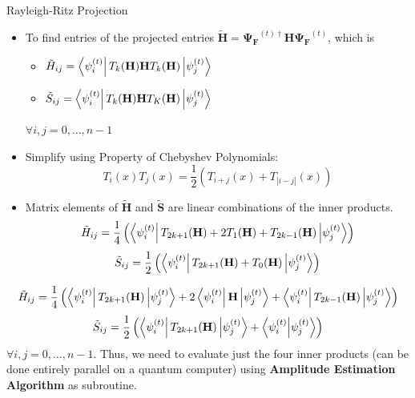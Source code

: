 \documentclass[serif, aspectratio=169]{beamer}
\begin{document}
\begin{frame}{Rayleigh-Ritz Projection}
    \begin{itemize}
        \item To find entries of the projected entries $\tilde{\mathbf{H}}=\boldsymbol{\Psi_F}^{(t)\dagger}\mathbf{H}\boldsymbol{\Psi_F}^{(t)}$, which is
        \begin{itemize}
            \item $\tilde{H}_{ij}=\bra{\psi_i^{(t)}}T_k(\mathbf{H})\mathbf{H}T_k(\mathbf{H})\ket{\psi_j^{(t)}}$
            \item $\tilde{S}_{ij}=\bra{\psi_i^{(t)}}T_k(\mathbf{H})\mathbf{H}T_K(\mathbf{H})\ket{\psi_j^{(t)}}$
        \end{itemize}
        $\forall i,j=0,\ldots,n-1$
         \item Simplify using Property of Chebyshev Polynomials:
        \[
        T_i(x)T_j(x)=\frac{1}{2}\left(T_{i+j}(x)+T_{|i-j|}(x)\right)
        \]
        \item Matrix elements of $\tilde{\mathbf{H}}$ and $\tilde{\mathbf{S}}$ are linear combinations of the inner products.
        \[
        \tilde{H}_{ij}=\frac{1}{4}\left(\bra{\psi_i^{(t)}}T_{2k+1}(\mathbf{H})+2T_1(\mathbf{H})+T_{2k-1}(\mathbf{H})\ket{\psi_j^{(t)}}\right)
        \]
        \[
        \tilde{S}_{ij}=\frac{1}{2}\left(\bra{\psi_i^{(t)}}T_{2k+1}(\mathbf{H})+T_0(\mathbf{H})\ket{\psi_j^{(t)}}\right)
        \]
    \end{itemize}
\end{frame}

\begin{frame}
    \[
    \tilde{H}_{ij} = \frac{1}{4}\left(\bra{\psi_i^{(t)}}T_{2k+1}(\mathbf{H})\ket{\psi_j^{(t)}} + 2\bra{\psi_i^{(t)}}\mathbf{H}\ket{\psi_j^{(t)}} + \bra{\psi_i^{(t)}}T_{2k-1}(\mathbf{H})\ket{\psi_j^{(t)}}\right)
    \]
    \[
    \tilde{S}_{ij} = \frac{1}{2}\left( \bra{\psi_i^{(t)}}T_{2k+1}(\mathbf{H})\ket{\psi_j^{(t)}} + \bra{\psi_i^{(t)}}\ket{\psi_j^{(t)}}\right)
    \]
    $\forall i,j=0,\ldots,n-1$.
    Thus, we need to evaluate just the four inner products (can be done entirely parallel on a quantum computer) using \textbf{Amplitude Estimation Algorithm} as subroutine.
\end{frame}
\end{document}
